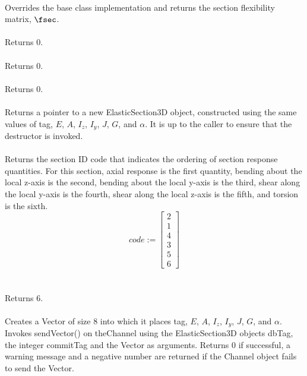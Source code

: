  \\
Overrides the base class implementation and returns the section
flexibility matrix, $\fsec$. \\

 \\
Returns $0$. \\

 \\
Returns $0$. \\

 \\
Returns $0$. \\

 \\
Returns a pointer to a new ElasticSection3D object, constructed
using the same values of \p tag, $E$, $A$, $I_z$, $I_y$, $J$, $G$, and $\alpha$.
It is up to the caller to ensure that the destructor is invoked. \\

 \\
Returns the section ID code that indicates the ordering of
section response quantities. For this section, axial response is the
first quantity, bending about the local z-axis is the second, bending about
the local y-axis is the third, shear along the local y-axis is the fourth,
shear along the local z-axis is the fifth, and torsion is the sixth. \\

\begin{equation}
code := \left[
   \begin{array}{c}
       2 \\
       1 \\
       4 \\
       3 \\
       5 \\
       6
   \end{array} 
 \right]
\end{equation} \\

 \\
Returns 6. \\

\\
Creates a Vector of size $8$ into which it places  \p tag,
$E$, $A$, $I_z$, $I_y$, $J$, $G$, and $\alpha$. Invokes sendVector() on 
\p theChannel using the ElasticSection3D objects \p dbTag, the integer
\p commitTag and the Vector as arguments. Returns $0$ if successful, a warning
message and a negative number are returned if the Channel object fails to send
the Vector. \\

